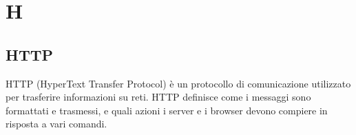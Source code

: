 \section*{H} 
\subsection*{HTTP} 
HTTP (HyperText Transfer Protocol) è un protocollo di comunicazione utilizzato per trasferire informazioni su reti. HTTP definisce come i messaggi sono formattati e trasmessi, e quali azioni i server e i browser devono compiere in risposta a vari comandi.
